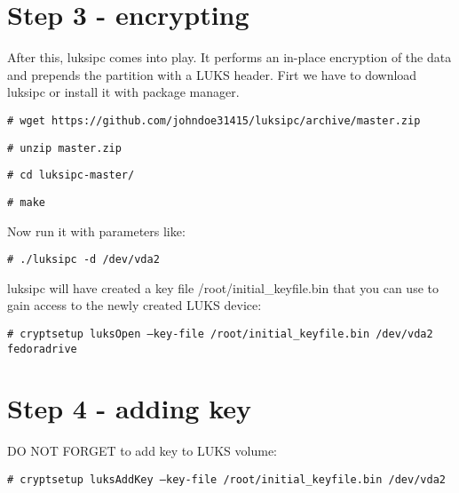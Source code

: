 \section{Step 3 - encrypting}
After this, luksipc comes into play. It performs an in-place encryption of the data and prepends the partition with a LUKS header. Firt we have to download luksipc or install it with package manager.

{\tt \# wget https://github.com/johndoe31415/luksipc/archive/master.zip}

{\tt \# unzip master.zip}

{\tt \# cd luksipc-master/}

{\tt \# make}

Now run it with parameters like:

{\tt \# ./luksipc -d /dev/vda2}

luksipc will have created a key file /root/initial\_keyfile.bin that you can use to gain access to the newly created LUKS device:

{\tt \# cryptsetup luksOpen --key-file /root/initial\_keyfile.bin /dev/vda2 fedoradrive}

\section{Step 4 - adding key}

DO NOT FORGET to add key to LUKS volume:

{\tt \# cryptsetup luksAddKey --key-file /root/initial\_keyfile.bin /dev/vda2}
